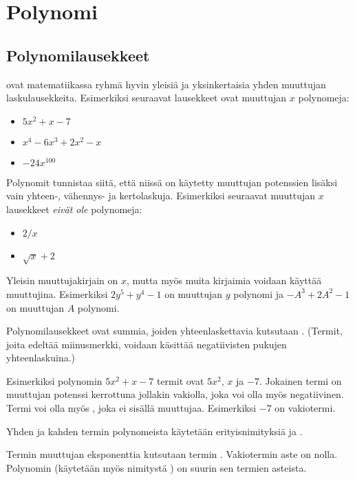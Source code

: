 \chapter{Polynomi}

\section{Polynomilausekkeet}

 ovat matematiikassa ryhmä hyvin yleisiä ja yksinkertaisia yhden muuttujan laskulausekkeita.
Esimerkiksi seuraavat lausekkeet ovat muuttujan $x$ polynomeja:
\begin{itemize}
\item $5x^2+x-7$
\item $x^4-6x^3+2x^2-x$
\item $-24x^{100}$
\end{itemize}
Polynomit tunnistaa siitä, että niissä on käytetty muuttujan potenssien lisäksi vain yhteen-, vähennys- ja kertolaskuja. Esimerkiksi seuraavat muuttujan $x$ lausekkeet \emph{eivät ole} polynomeja:
\begin{itemize}
\item $2/x$
\item $\sqrt{x}+2$
\end{itemize}
Yleisin muuttujakirjain on $x$, mutta myös muita kirjaimia voidaan käyttää
muuttujina. Esimerkiksi $2y^5+y^4-1$ on muuttujan $y$ polynomi ja
$-A^3+2A^2-1$ on muuttujan $A$ polynomi.

Polynomilausekkeet ovat summia, joiden yhteenlaskettavia kutsutaan . (Termit, joita edeltää miinusmerkki, voidaan käsittää negatiivisten pukujen yhteenlaskuina.)

Esimerkiksi polynomin $5x^2+x-7$ termit ovat $5x^2$, $x$ ja $-7$. Jokainen termi on muuttujan potenssi kerrottuna jollakin vakiolla, joka voi olla myös  negatiivinen. Termi voi olla myös , joka ei sisällä muuttujaa. Esimerkiksi $-7$ on vakiotermi.

Yhden ja kahden termin polynomeista käytetään erityisnimityksiä  ja .

Termin muuttujan eksponenttia kutsutaan termin .
Vakiotermin aste on nolla.
Polynomin  (käytetään myös nimitystä ) on suurin sen termien asteista.

